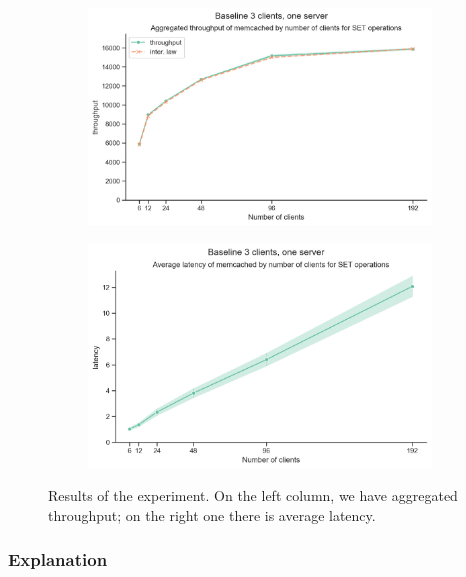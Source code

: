 \documentclass[11pt,a4paper]{article}
\begin{document}
\begin{figure}[H]
\begin{subfigure}[b]{0.5\linewidth}
	\end{subfigure}
	\begin{subfigure}[b]{0.5\linewidth}
		\includegraphics[width=\linewidth]{images/baseline_1/last_graph_set_throughput.pdf}
	\end{subfigure}
	\begin{subfigure}[b]{0.5\linewidth}
		\includegraphics[width=\linewidth]{images/baseline_1/last_graph_set_latency.pdf}
	\end{subfigure}
	\caption{Results of the experiment. On the left column, we have aggregated throughput; on the right one there is average latency.}
	\label{fig:boat1}
\end{figure}

\subsubsection{Explanation}


\end{document}
